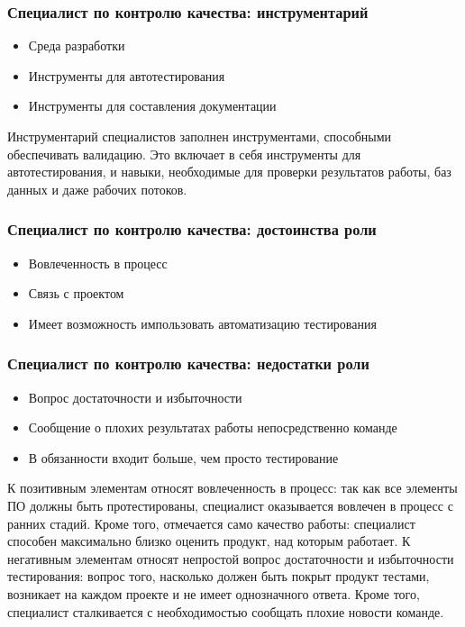 \documentclass{../industrial-development}
\begin{document}
\begin{frame} \frametitle{Специалист по контролю качества: инструментарий}
  \begin{itemize}
  \item Среда разработки
  \item Инструменты для автотестирования
  \item Инструменты для составления документации
  \end{itemize}
\end{frame}

\lecturenotes

Инструментарий специалистов заполнен инструментами, способными обеспечивать валидацию. Это включает в себя инструменты для автотестирования, и навыки, необходимые для проверки результатов работы, баз данных и даже рабочих потоков.  ~\cite{Anatomy}

\begin{frame} \frametitle{Специалист по контролю качества: достоинства роли}
  \begin{itemize}
  \item Вовлеченность в процесс
  \item Связь с проектом
  \item Имеет возможность импользовать автоматизацию тестирования
  \end{itemize}
\end{frame}

\begin{frame} \frametitle{Специалист по контролю качества: недостатки роли}
  \begin{itemize}
  \item Вопрос достаточности и избыточности
  \item Сообщение о плохих результатах работы непосредственно команде
  \item В обязанности входит больше, чем просто тестирование
  \end{itemize}
\end{frame}

\lecturenotes

К позитивным элементам относят вовлеченность в процесс: так как все элементы ПО должны быть протестированы, специалист оказывается вовлечен в процесс с ранних стадий. Кроме того, отмечается само качество работы: специалист способен максимально близко оценить продукт, над которым работает. 
К негативным элементам относят непростой вопрос достаточности и избыточности тестирования: вопрос того, насколько должен быть покрыт продукт тестами, возникает на каждом проекте и не имеет однозначного ответа. Кроме того, специалист сталкивается с необходимостью сообщать плохие новости команде.  ~\cite{Anatomy}
\end{document}
